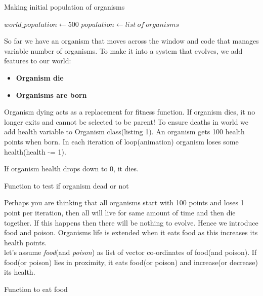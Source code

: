 \documentclass[conference]{IEEEtran}
\begin{document}
\begin{algorithm}
\caption{Making initial population of organisms}
\begin{algorithmic} 
\STATE $world\_population\gets 500$
\STATE $population\gets list\ of\ organisms$
\ENDFOR
\end{algorithmic}
\end{algorithm}

So far we have an organism that moves across the window and code that manages variable number of organisms. To make it into a system that evolves, we add features to our world:
\begin{itemize}
\item \textbf{Organism die}
\item \textbf{Organisms are born}
\end{itemize}
Organism dying acts as a replacement for fitness function. If organism dies, it no longer exits and cannot be selected to be parent! To ensure deaths in world we add health variable to Organism class(listing 1). An organism gets 100 health points when born. In each iteration of loop(animation) organism loses some health(health -= 1).

If organism health drops down to 0, it dies.

\begin{algorithm}
\caption{Function to test if organism dead or not}
\begin{algorithmic} 
\ELSE
{}
\ENDIF
\end{algorithmic}
\end{algorithm}

Perhaps you are thinking that all organisms start with 100 points and loses 1 point per iteration, then all will live for same amount of time and then die together. If this happens then there will be nothing to evolve. Hence we introduce food and poison. Organisms life is extended when it eats food as this increases its health points.\\
let's assume \textit{food}(and \textit{poison}) as list of vector co-ordinates of food(and poison). If food(or poison) lies in proximity, it eats food(or poison) and increase(or decrease) its health.

\begin{algorithm}
\caption{Function to eat food}
\begin{algorithmic} 
\ENDIF
\ENDFOR
\end{algorithmic}
\end{algorithm}
\end{document}
